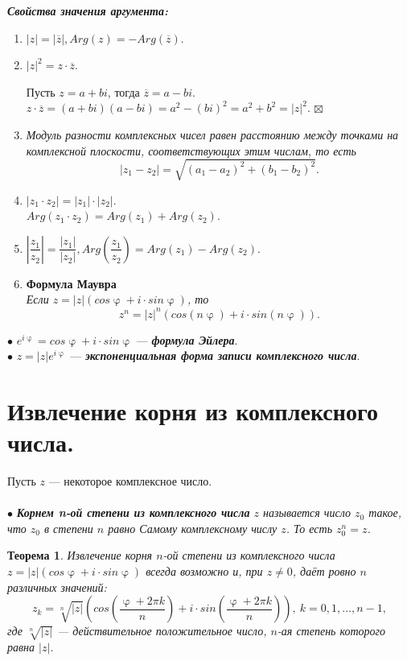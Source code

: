\documentclass[a4paper, 12pt]{report}
\newenvironment{Proof} %
{\par\noindent{\textit{Доказательство.}\\}} %
{\hfill$\scriptstyle\boxtimes$}
\renewcommand{\varphi}{\upvarphi}
\begin{document}
\textbf{\textit{Свойства значения аргумента:}}\begin{enumerate}
	\item $|z| = |\overline{z}|, Arg(z) = -Arg(\overline{z})$.
	\item $|z|^2 = z\cdot\overline{z}$.\begin{Proof}
		Пусть $z = a + bi$, тогда $\overline{z} = a - bi$.\\
		$z\cdot\overline{z} = (a+bi)(a-bi) = a^2 - (bi)^2 = a^2 + b^2 = |z|^2$.
	\end{Proof}
	\item \textit{Модуль разности комплексных чисел равен расстоянию между точками на комплексной плоскости, соответствующих этим числам, то есть $$|z_1 - z_2| = \sqrt{(a_1 - a_2)^2 + (b_1 - b_2)^2}.$$}
	\item $|z_1\cdot z_2| = |z_1|\cdot|z_2|$.\\
	$Arg(z_1\cdot z_2) = Arg(z_1) + Arg(z_2).$
	\item $\left | \dfrac{z_1}{z_2} \right | = \dfrac{|z_1|}{|z_2|}, Arg(\dfrac{z_1}{z_2}) = Arg(z_1) - Arg(z_2)$.
	\item \textbf{Формула Маувра}\\
	\textit{Если $z = |z|(cos\varphi + i\cdot sin\varphi)$, то} $$z^n = |z|^n(cos(n\varphi) + i\cdot sin(n\varphi)).$$
\end{enumerate}
$\bullet$ $e^{i\varphi}=cos\varphi + i\cdot sin\varphi$ --- \textit{\textbf{формула Эйлера}}.\\
$\bullet$ $z = |z| e^{i\varphi}$ ---\textit{ \textbf{экспоненциальная форма записи комплексного числа}}.





\section*{Извлечение корня из комплексного числа.}
Пусть $z$ --- некоторое комплексное число.\\\\
$\bullet$ \textit{\textbf{Корнем n-ой степени из комплексного числа} $z$ называется число $z_0$ такое, что $z_0$ в степени $n$ равно Самому комплексному числу $z$. То есть $z_0^n = z$.}
\newtheorem*{t6_3_1}{Теорема}\begin{t6_3_1} Извлечение корня $n$-ой степени из комплексного числа $z = |z|(cos\varphi + i\cdot sin\varphi)$ всегда возможно и, при $z\ne 0$, даёт
	ровно $n$ различных значений: $$z_k = \sqrt[n]{|z|}\left(cos\left (\dfrac{\varphi + 2\pi k}{n}\right ) + i\cdot sin\left(\dfrac{\varphi + 2\pi k}{n}\right) \right),\ k=0,1,\dots,n-1,$$
	где $\sqrt[n]{|z|}$ --- действительное положительное число, $n$-ая степень которого равна $|z|$.
\end{t6_3_1}
\end{document}
